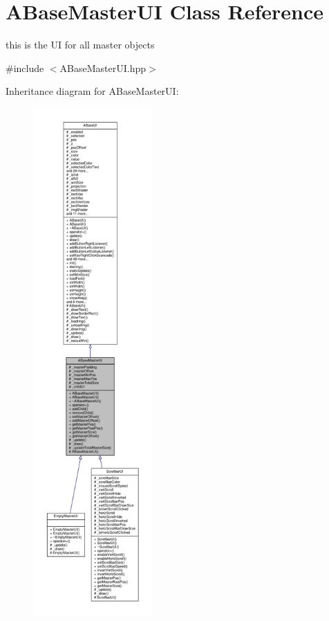 \hypertarget{class_a_base_master_u_i}{}\section{A\+Base\+Master\+UI Class Reference}
\label{class_a_base_master_u_i}


this is the UI for all master objects  




{\ttfamily \#include $<$A\+Base\+Master\+U\+I.\+hpp$>$}



Inheritance diagram for A\+Base\+Master\+UI\+:
\nopagebreak
\begin{figure}[H]
\begin{center}
\leavevmode
\includegraphics[height=550pt]{class_a_base_master_u_i__inherit__graph}
\end{center}
\end{figure}



